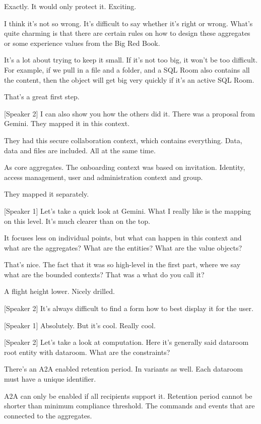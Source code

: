 Exactly. It would only protect it. Exciting.

I think it's not so wrong. It's difficult to say whether it's right or wrong. What's quite charming is that there are certain rules on how to design these aggregates or some experience values from the Big Red Book.

It's a lot about trying to keep it small. If it's not too big, it won't be too difficult. For example, if we pull in a file and a folder, and a SQL Room also contains all the content, then the object will get big very quickly if it's an active SQL Room.

That's a great first step.

[Speaker 2]
I can also show you how the others did it. There was a proposal from Gemini. They mapped it in this context.

They had this secure collaboration context, which contains everything. Data, data and files are included. All at the same time.

As core aggregates. The onboarding context was based on invitation. Identity, access management, user and administration context and group.

They mapped it separately.

[Speaker 1]
Let's take a quick look at Gemini. What I really like is the mapping on this level. It's much clearer than on the top.

It focuses less on individual points, but what can happen in this context and what are the aggregates? What are the entities? What are the value objects?

That's nice. The fact that it was so high-level in the first part, where we say what are the bounded contexts? That was a what do you call it?

A flight height lower. Nicely drilled.

[Speaker 2]
It's always difficult to find a form how to best display it for the user.

[Speaker 1]
Absolutely. But it's cool. Really cool.

[Speaker 2]
Let's take a look at computation. Here it's generally said dataroom root entity with dataroom. What are the constraints?

There's an A2A enabled retention period. In variants as well. Each dataroom must have a unique identifier.

A2A can only be enabled if all recipients support it. Retention period cannot be shorter than minimum compliance threshold. The commands and events that are connected to the aggregates.

